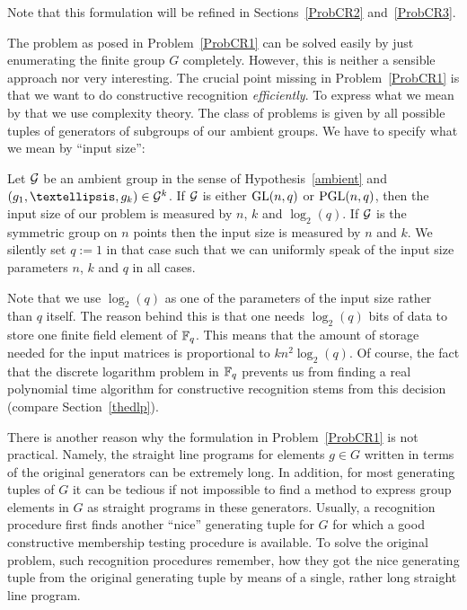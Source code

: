 Note that this formulation will be refined in Sections~\ref{ProbCR2} 
and~\ref{ProbCR3}.

\smallskip
The problem as posed in Problem~\ref{ProbCR1} can be solved easily by just
enumerating the finite group $G$ completely. However, this is neither
a sensible approach nor very interesting. The crucial point missing
in Problem~\ref{ProbCR1} is that we want to do constructive recognition
\emph{efficiently}. To express what we mean by that we use complexity
theory. The class of problems is given by all possible tuples of
generators of subgroups of our ambient groups. We have to specify
what we mean by ``input size'':

\begin{Def}
\label{inputsize}
Let $\mathcal{G}$ be an ambient group in the sense of Hypothesis~\ref{ambient}
and $(g_1, \ldots, g_k) \in \GG^k$. If $\mathcal{G}$ is either $\GL(n,q)$ or
$\PGL(n,q)$, then the input size of our problem is measured by $n$, $k$
and $\log_2(q)$. If $\mathcal{G}$ is the symmetric group on $n$ points then the
input size is measured by $n$ and $k$. We silently set $q := 1$ in that
case such that we can uniformly speak of the input size parameters $n$, $k$
and $q$ in all cases.
\end{Def}

\begin{Rem}
Note that we use $\log_2(q)$ as one of the parameters of the input size
rather than $q$ itself. The reason behind this is that one needs
$\log_2(q)$ bits of data to store one finite field element of $\mathbb{F}_q$.
This means that the amount of storage needed for the input matrices is
proportional to $kn^2\log_2(q)$. Of course, the fact that the discrete
logarithm problem in $\mathbb{F}_q$ prevents us from finding a real polynomial
time algorithm for constructive recognition stems from this decision
(compare Section~\ref{thedlp}).
\proofend
\end{Rem}

There is another reason why the formulation in Problem~\ref{ProbCR1} is not
practical. Namely, the straight line programs for elements $g \in G$
written in terms of the original generators can be extremely long. In
addition, for most generating tuples of $G$ it can be tedious if not
impossible to find a method to express group elements in $G$ as straight
programs in these generators. Usually, a recognition procedure first finds
another ``nice'' generating tuple for $G$ for which a good constructive
membership testing procedure is available. To solve the original problem,
such recognition procedures remember, how they got the nice generating
tuple from the original generating tuple by means of a single, rather long
straight line program.

